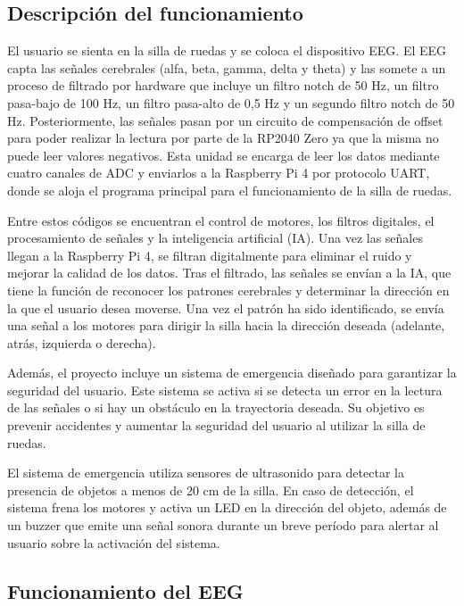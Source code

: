 \documentclass{article}
\begin{document}
\subsection{Descripción del funcionamiento}
El usuario se sienta en la silla de ruedas y se coloca el dispositivo EEG. El EEG capta las señales cerebrales (alfa, beta, gamma, delta y theta) y las somete a un proceso de filtrado por hardware que incluye un filtro notch de 50 Hz, un filtro pasa-bajo de 100 Hz, un filtro pasa-alto de 0,5 Hz y un segundo filtro notch de 50 Hz. Posteriormente, las señales pasan por un circuito de compensación de offset para poder realizar la lectura por parte de la RP2040 Zero ya que la misma no puede leer valores negativos. Esta unidad se encarga de leer los datos mediante cuatro canales de ADC y enviarlos a la Raspberry Pi 4 por protocolo UART, donde se aloja el programa principal para el funcionamiento de la silla de ruedas.

Entre estos códigos se encuentran el control de motores, los filtros digitales, el procesamiento de señales y la inteligencia artificial (IA). Una vez las señales llegan a la Raspberry Pi 4, se filtran digitalmente para eliminar el ruido y mejorar la calidad de los datos. Tras el filtrado, las señales se envían a la IA, que tiene la función de reconocer los patrones cerebrales y determinar la dirección en la que el usuario desea moverse. Una vez el patrón ha sido identificado, se envía una señal a los motores para dirigir la silla hacia la dirección deseada (adelante, atrás, izquierda o derecha).

Además, el proyecto incluye un sistema de emergencia diseñado para garantizar la seguridad del usuario. Este sistema se activa si se detecta un error en la lectura de las señales o si hay un obstáculo en la trayectoria deseada. Su objetivo es prevenir accidentes y aumentar la seguridad del usuario al utilizar la silla de ruedas.

El sistema de emergencia utiliza sensores de ultrasonido para detectar la presencia de objetos a menos de 20 cm de la silla. En caso de detección, el sistema frena los motores y activa un LED en la dirección del objeto, además de un buzzer que emite una señal sonora durante un breve período para alertar al usuario sobre la activación del sistema.

\subsection{Funcionamiento del EEG}
\end{document}
